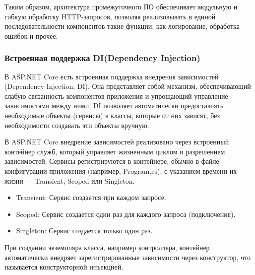 Таким образом, архитектура промежуточного ПО обеспечивает модульную и гибкую обработку HTTP-запросов, позволяя реализовывать в единой последовательности компонентов такие функции, как логирование, обработка ошибок и прочее.

\subsubsection{Встроенная поддержка DI(Dependency Injection)}
В ASP.NET Core есть встроенная поддержка внедрения зависимостей (Dependency Injection, DI). Она представляет собой механизм, обеспечивающий слабую связанность компонентов приложения и упрощающий управление зависимостями между ними. DI позволяет автоматически предоставлять необходимые объекты (сервисы) в классы, которые от них зависят, без необходимости создавать эти объекты вручную. \cite{DependencyInjection}

В ASP.NET Core внедрение зависимостей реализовано через встроенный контейнер служб, который управляет жизненным циклом и разрешением зависимостей. Сервисы регистрируются в контейнере, обычно в файле конфигурации приложения (например, Program.cs), с указанием времени их жизни --- Transient,  Scoped или Singleton. 

\begin{itemize}
	\item{Transient: Сервис создается при каждом запросе.}
	\item{Scoped: Сервис создается один раз для каждого запроса (подключения).}
	\item{Singleton: Сервис создается только один раз.}
\end{itemize}

При создании экземпляра класса, например контроллера, контейнер автоматически внедряет зарегистрированные зависимости через конструктор, что называется конструкторной инъекцией.
